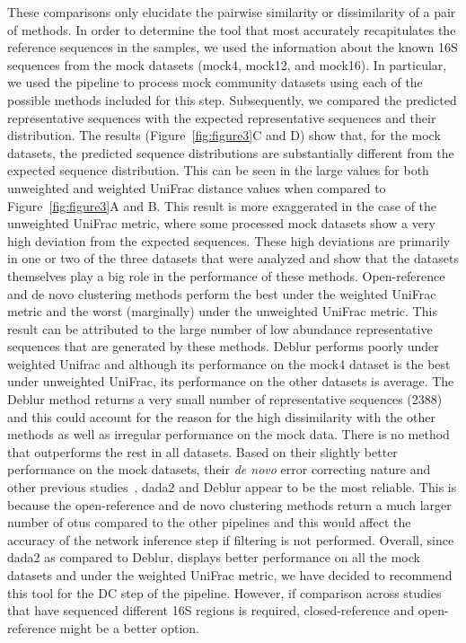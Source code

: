   These comparisons only elucidate the pairwise similarity or dissimilarity of a pair of methods.
  In order to determine the tool that most accurately recapitulates the reference sequences in the samples, we used the information about the known 16S sequences from the mock datasets (mock4, mock12, and mock16).
  In particular, we used the pipeline to process mock community datasets using each of the possible methods included for this step.
  Subsequently, we compared the predicted representative sequences with the expected representative sequences and their distribution.
  The results (Figure~\ref{fig:figure3}C and D) show that, for the mock datasets, the predicted sequence distributions are substantially different from the expected sequence distribution.
  This can be seen in the large values for both unweighted and weighted UniFrac distance values when compared to Figure~\ref{fig:figure3}A and B.
  This result is more exaggerated in the case of the unweighted UniFrac metric, where some processed mock datasets show a very high deviation from the expected sequences.
  These high deviations are primarily in one or two of the three datasets that were analyzed and show that the datasets themselves play a big role in the performance of these methods.
  Open-reference and de novo clustering methods perform the best under the weighted UniFrac metric and the worst (marginally) under the unweighted UniFrac metric.
  This result can be attributed to the large number of low abundance representative sequences that are generated by these methods.
  Deblur performs poorly under weighted Unifrac and although its performance on the mock4 dataset is the best under unweighted UniFrac, its performance on the other datasets is average.
  The Deblur method returns a very small number of representative sequences (2388) and this could account for the reason for the high dissimilarity with the other methods as well as irregular performance on the mock data.
  There is no method that outperforms the rest in all datasets.
  Based on their slightly better performance on the mock datasets, their \textit{de novo} error correcting nature and other previous studies~\cite{Nearing2018}, \ac{dada2} and Deblur appear to be the most reliable.
  This is because the open-reference and de novo clustering methods return a much larger number of \ac{otu}s compared to the other pipelines and this would affect the accuracy of the network inference step if filtering is not performed.
  Overall, since \ac{dada2} as compared to Deblur, displays better performance on all the mock datasets and under the weighted UniFrac metric, we have decided to recommend this tool for the DC step of the pipeline.
  However, if comparison across studies that have sequenced different 16S regions is required, closed-reference and open-reference might be a better option.

